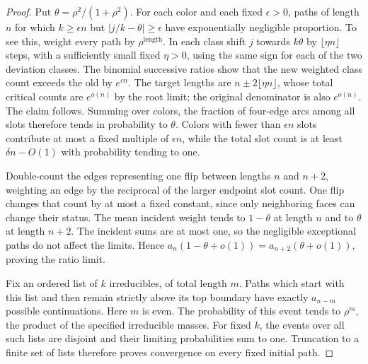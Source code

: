 \begin{proof}
Put $\theta=\rho^2/(1+\rho^2)$. For each color and each fixed $\epsilon>0$, paths of length $n$ for which $k\ge\epsilon n$ but $|j/k-\theta|\ge\epsilon$ have exponentially negligible proportion. To see this, weight every path by $\rho^{\text{length}}$. In each class shift $j$ towards $k\theta$ by $\lfloor\eta n\rfloor$ steps, with a sufficiently small fixed $\eta>0$, using the same sign for each of the two deviation classes. The binomial successive ratios show that the new weighted class count exceeds the old by $e^{c n}$. The target lengths are $n\pm2\lfloor\eta n\rfloor$, whose total critical counts are $e^{o(n)}$ by the root limit; the original denominator is also $e^{o(n)}$. The claim follows. Summing over colors, the fraction of four-edge arcs among all slots therefore tends in probability to $\theta$. Colors with fewer than $\epsilon n$ slots contribute at most a fixed multiple of $\epsilon n$, while the total slot count is at least $\delta n-O(1)$ with probability tending to one.

Double-count the edges representing one flip between lengths $n$ and $n+2$, weighting an edge by the reciprocal of the larger endpoint slot count. One flip changes that count by at most a fixed constant, since only neighboring faces can change their status. The mean incident weight tends to $1-\theta$ at length $n$ and to $\theta$ at length $n+2$. The incident sums are at most one, so the negligible exceptional paths do not affect the limits. Hence
$a_n(1-\theta+o(1))=a_{n+2}(\theta+o(1))$, proving the ratio limit.

Fix an ordered list of $k$ irreducibles, of total length $m$. Paths which start with this list and then remain strictly above its top boundary have exactly $a_{n-m}$ possible continuations. Here $m$ is even. The probability of this event tends to $\rho^m$, the product of the specified irreducible masses. For fixed $k$, the events over all such lists are disjoint and their limiting probabilities sum to one. Truncation to a finite set of lists therefore proves convergence on every fixed initial path.
\end{proof}
